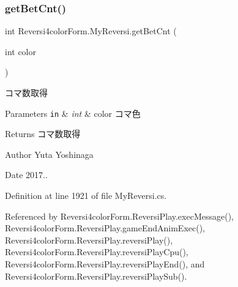 \mbox{\label{class_reversi4color_form_1_1_my_reversi_ae184f1817b7dfac87613179e3e7e9124}} 
\subsubsection{\texorpdfstring{get\+Bet\+Cnt()}{getBetCnt()}}
{\footnotesize\ttfamily int Reversi4color\+Form.\+My\+Reversi.\+get\+Bet\+Cnt (\begin{DoxyParamCaption}\item[{int}]{color }\end{DoxyParamCaption})}



コマ数取得 


\begin{DoxyParams}[1]{Parameters}
\mbox{\tt in}  & {\em int} & color コマ色 \\
\hline
\end{DoxyParams}
\begin{DoxyReturn}{Returns}
コマ数取得 
\end{DoxyReturn}
\begin{DoxyAuthor}{Author}
Yuta Yoshinaga 
\end{DoxyAuthor}
\begin{DoxyDate}{Date}
2017.. 
\end{DoxyDate}


Definition at line 1921 of file My\+Reversi.\+cs.



Referenced by Reversi4color\+Form.\+Reversi\+Play.\+exec\+Message(), Reversi4color\+Form.\+Reversi\+Play.\+game\+End\+Anim\+Exec(), Reversi4color\+Form.\+Reversi\+Play.\+reversi\+Play(), Reversi4color\+Form.\+Reversi\+Play.\+reversi\+Play\+Cpu(), Reversi4color\+Form.\+Reversi\+Play.\+reversi\+Play\+End(), and Reversi4color\+Form.\+Reversi\+Play.\+reversi\+Play\+Sub().

